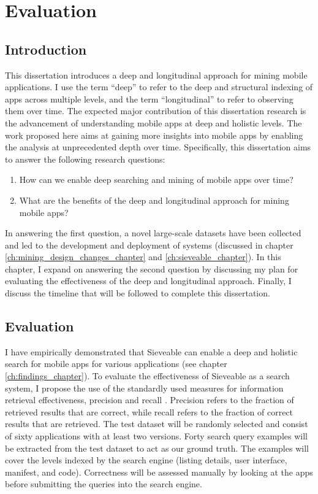 \chapter{Evaluation}

\section{Introduction}
\label{ch:propsal}
This dissertation introduces a deep and longitudinal approach for mining mobile applications.
I use the term ``deep'' to refer to the deep and structural indexing of apps across multiple levels, and the term ``longitudinal'' to refer to observing them over time.
The expected major contribution of this dissertation research is the advancement of understanding mobile apps at deep and holistic levels.
The work proposed here aims at gaining more insights into mobile apps by enabling the analysis at unprecedented depth over time.
Specifically, this dissertation aims to answer the following research questions:
\begin{enumerate}
	\item How can we enable deep searching and mining of mobile apps over time?
	\item What are the benefits of the deep and longitudinal approach for mining mobile apps?
\end{enumerate}

In answering the first question, a novel large-scale datasets have been collected and led to the development and deployment of systems (discussed in chapter \ref{ch:mining_design_changes_chapter} and \ref{ch:sieveable_chapter}).
In this chapter, I expand on answering the second question by discussing my plan for evaluating the effectiveness of the deep and longitudinal approach.
Finally, I discuss the timeline that will be followed to complete this dissertation.

\section{Evaluation}
I have empirically demonstrated that Sieveable can enable a deep and holistic search for mobile apps for various applications (see chapter \ref{ch:findings_chapter}).
To evaluate the effectiveness of Sieveable as a search system, I propose the use of the standardly used measures for information retrieval effectiveness, precision and recall \cite{manning_2008_intro_to_IR}.
Precision refers to the fraction of retrieved results that are correct, while recall refers to the fraction of correct results that are retrieved.
The test dataset will be randomly selected and consist of sixty applications with at least two versions.
Forty search query examples will be extracted from the test dataset to act as our ground truth.
The examples will cover the levels indexed by the search engine (listing details, user interface, manifest, and code).
Correctness will be assessed manually by looking at the apps before submitting the queries into the search engine.

